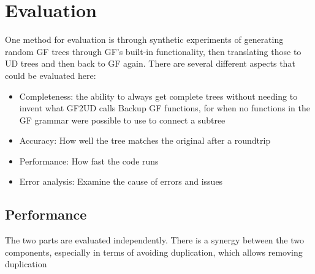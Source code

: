 \chapter{Evaluation}


One method for evaluation is through synthetic experiments of generating random GF trees through GF's built-in functionality, then translating those to UD trees and then back to GF again. There are several different aspects that could be evaluated here:
\begin{itemize}
    \item Completeness: the ability to always get complete trees without needing to invent what GF2UD calls Backup GF functions, for when no functions in the GF grammar were possible to use to connect a subtree
    \item Accuracy: How well the tree matches the original after a roundtrip
    \item Performance: How fast the code runs
    \item Error analysis: Examine the cause of errors and issues
\end{itemize}




\section{Performance}

The two parts are evaluated independently. There is a synergy between the two components, especially in terms of avoiding duplication, which allows removing duplication